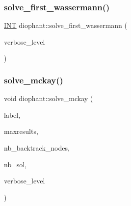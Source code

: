 \mbox{\label{classdiophant_a92637742ec81ffe4d613c355e40bd135}} 
\subsubsection{\texorpdfstring{solve\+\_\+first\+\_\+wassermann()}{solve\_first\_wassermann()}}
{\footnotesize\ttfamily \mbox{\hyperlink{galois_8h_a09fddde158a3a20bd2dcadb609de11dc}{I\+NT}} diophant\+::solve\+\_\+first\+\_\+wassermann (\begin{DoxyParamCaption}\item[{\mbox{\hyperlink{galois_8h_a09fddde158a3a20bd2dcadb609de11dc}{I\+NT}}}]{verbose\+\_\+level }\end{DoxyParamCaption})}

\mbox{\label{classdiophant_ac774ce59f7b84f44c6bddfe54407143b}} 
\subsubsection{\texorpdfstring{solve\+\_\+mckay()}{solve\_mckay()}}
{\footnotesize\ttfamily void diophant\+::solve\+\_\+mckay (\begin{DoxyParamCaption}\item[{const \mbox{\hyperlink{galois_8h_ab6cc7b4aeb6ea31aba2b3fbfc83ff5e6}{B\+Y\+TE}} $\ast$}]{label,  }\item[{\mbox{\hyperlink{galois_8h_a09fddde158a3a20bd2dcadb609de11dc}{I\+NT}}}]{maxresults,  }\item[{\mbox{\hyperlink{galois_8h_a09fddde158a3a20bd2dcadb609de11dc}{I\+NT}} \&}]{nb\+\_\+backtrack\+\_\+nodes,  }\item[{\mbox{\hyperlink{galois_8h_a09fddde158a3a20bd2dcadb609de11dc}{I\+NT}} \&}]{nb\+\_\+sol,  }\item[{\mbox{\hyperlink{galois_8h_a09fddde158a3a20bd2dcadb609de11dc}{I\+NT}}}]{verbose\+\_\+level }\end{DoxyParamCaption})}

\mbox{\label{classdiophant_accde63853266e33e7835eee46eb00bb6}} 
